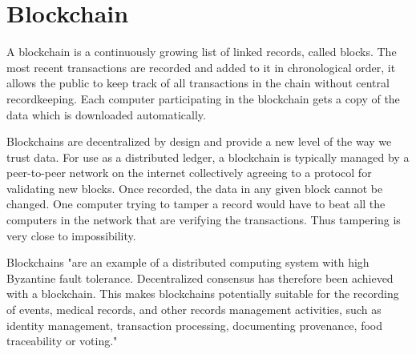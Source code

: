 \section{Blockchain}

A blockchain is a continuously growing list of linked records, called blocks. The most recent transactions are recorded and added to it in chronological order, it allows the public to keep track of all transactions in the chain without central recordkeeping.  Each computer participating in the blockchain gets a copy of the data which is downloaded automatically. 

Blockchains are decentralized by design and provide a new level of the way we trust data. For use as a distributed ledger, a blockchain is typically managed by a peer-to-peer network on the internet collectively agreeing to a protocol for validating new blocks. Once recorded, the data in any given block cannot be changed. One computer trying to tamper a record would have to beat all the computers in the network that are verifying the transactions. Thus tampering is very close to impossibility.

Blockchains "are an example of a distributed computing system with high Byzantine fault tolerance. Decentralized consensus has therefore been achieved with a blockchain. This makes blockchains potentially suitable for the recording of events, medical records, and other records management activities, such as identity management, transaction processing, documenting provenance, food traceability or voting."  \cite{hid-sp18-506-Blockchain}
